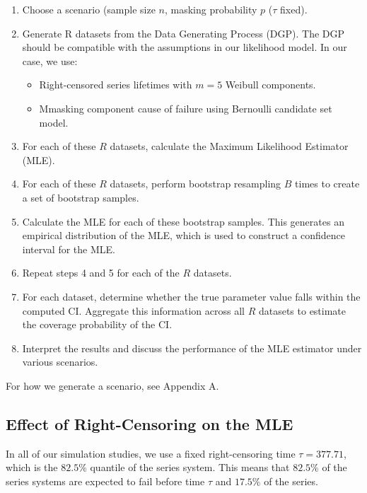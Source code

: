 \documentclass[
]{article}
\begin{document}
\begin{enumerate}
\def\labelenumi{\arabic{enumi}.}
\item
  Choose a scenario (sample size \(n\), masking probability \(p\)
  (\(\tau\) fixed).
\item
  Generate R datasets from the Data Generating Process (DGP). The DGP
  should be compatible with the assumptions in our likelihood model. In
  our case, we use:

  \begin{itemize}
  \item
    Right-censored series lifetimes with \(m = 5\) Weibull components.
  \item
    Mmasking component cause of failure using Bernoulli candidate set
    model.
  \end{itemize}
\item
  For each of these \(R\) datasets, calculate the Maximum Likelihood
  Estimator (MLE).
\item
  For each of these \(R\) datasets, perform bootstrap resampling \(B\)
  times to create a set of bootstrap samples.
\item
  Calculate the MLE for each of these bootstrap samples. This generates
  an empirical distribution of the MLE, which is used to construct a
  confidence interval for the MLE.
\item
  Repeat steps 4 and 5 for each of the \(R\) datasets.
\item
  For each dataset, determine whether the true parameter value falls
  within the computed CI. Aggregate this information across all \(R\)
  datasets to estimate the coverage probability of the CI.
\item
  Interpret the results and discuss the performance of the MLE estimator
  under various scenarios.
\end{enumerate}

For how we generate a scenario, see Appendix A.

\hypertarget{effect-of-right-censoring-on-the-mle}{%
\subsection{Effect of Right-Censoring on the
MLE}\label{effect-of-right-censoring-on-the-mle}}

In all of our simulation studies, we use a fixed right-censoring time
\(\tau = 377.71\), which is the \(82.5\%\) quantile of the series
system. This means that \(82.5\%\) of the series systems are expected to
fail before time \(\tau\) and \(17.5\%\) of the series.
\end{document}
